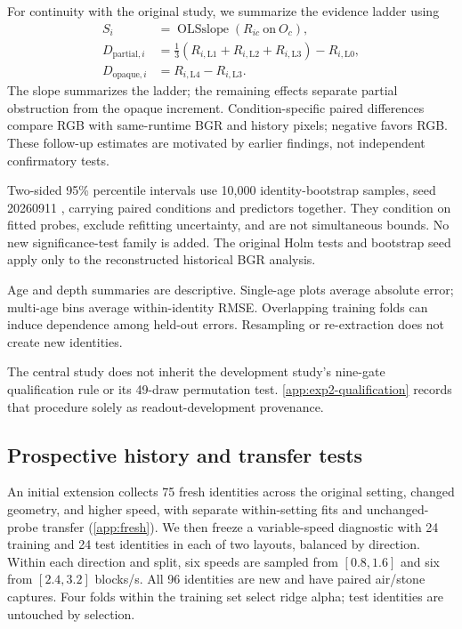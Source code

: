 \documentclass{article}
\begin{document}
For continuity with the original study, we summarize the evidence ladder using
\begin{align}
S_i &= \operatorname{OLSslope}(R_{ic}\ \text{on}\ O_c),\\
D_{\mathrm{partial},i} &=
 \tfrac13(R_{i,\mathrm{L1}}+R_{i,\mathrm{L2}}+R_{i,\mathrm{L3}})-R_{i,\mathrm{L0}},\\
D_{\mathrm{opaque},i} &=R_{i,\mathrm{L4}}-R_{i,\mathrm{L3}}.
\end{align}
The slope summarizes the ladder; the remaining effects separate partial obstruction from the opaque increment. Condition-specific paired differences compare RGB with same-runtime BGR and history pixels; negative favors RGB. These follow-up estimates are motivated by earlier findings, not independent confirmatory tests.

Two-sided 95\% percentile intervals use 10,000 identity-bootstrap samples, seed 20260911 \citep{efron1993bootstrap}, carrying paired conditions and predictors together. They condition on fitted probes, exclude refitting uncertainty, and are not simultaneous bounds. No new significance-test family is added. The original Holm tests and bootstrap seed apply only to the reconstructed historical BGR analysis.

Age and depth summaries are descriptive. Single-age plots average absolute error; multi-age bins average within-identity RMSE. Overlapping training folds can induce dependence among held-out errors. Resampling or re-extraction does not create new identities.

The central study does not inherit the development study's nine-gate qualification rule or its 49-draw permutation test. \autoref{app:exp2-qualification} records that procedure solely as readout-development provenance.


\subsection{Prospective history and transfer tests}
\label{sec:fresh-method}
An initial extension collects 75 fresh identities across the original setting, changed geometry, and higher speed, with separate within-setting fits and unchanged-probe transfer (\autoref{app:fresh}). We then freeze a variable-speed diagnostic with 24 training and 24 test identities in each of two layouts, balanced by direction. Within each direction and split, six speeds are sampled from $[0.8,1.6]$ and six from $[2.4,3.2]$ blocks/s. All 96 identities are new and have paired air/stone captures. Four folds within the training set select ridge alpha; test identities are untouched by selection.
\end{document}
